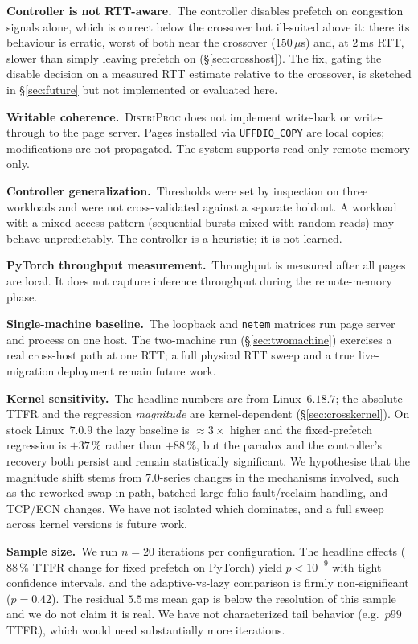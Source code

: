 \documentclass[journal]{IEEEtran}
\newcommand{\distriproc}{\textsc{DistriProc}\xspace}
\begin{document}
\textbf{Controller is not RTT-aware.}\, The controller disables prefetch on
congestion signals alone, which is correct below the crossover but ill-suited
above it: there its behaviour is erratic, worst of both near the crossover
($150\,\mu$s) and, at $2$\,ms RTT, slower than simply leaving prefetch on
(\S\ref{sec:crosshost}). The fix, gating the disable decision on a measured
RTT estimate relative to the crossover, is sketched in \S\ref{sec:future} but
not implemented or evaluated here.

\textbf{Writable coherence.}\, \distriproc does not implement write-back or
write-through to the page server. Pages installed via
\texttt{UFFDIO\_COPY} are local copies; modifications are not propagated.
The system supports read-only remote memory only.

\textbf{Controller generalization.}\, Thresholds were set by inspection
on three workloads and were not cross-validated against a separate
holdout. A workload with a mixed access pattern (sequential bursts mixed
with random reads) may behave unpredictably. The controller is a
heuristic; it is not learned.

\textbf{PyTorch throughput measurement.}\, Throughput is measured after
all pages are local. It does not capture inference throughput during the
remote-memory phase.

\textbf{Single-machine baseline.}\, The loopback and \texttt{netem} matrices
run page server and process on one host. The two-machine run
(\S\ref{sec:twomachine}) exercises a real cross-host path at one RTT; a full
physical RTT sweep and a true live-migration deployment remain future work.

\textbf{Kernel sensitivity.}\, The headline numbers are from Linux~$6.18.7$;
the absolute TTFR and the regression \emph{magnitude} are kernel-dependent
(\S\ref{sec:crosskernel}). On stock Linux~$7.0.9$ the lazy baseline is
$\approx\!3\times$ higher and the fixed-prefetch regression is $+37\,\%$
rather than $+88\,\%$, but the paradox and the controller's recovery both
persist and remain statistically significant. We hypothesise that the
magnitude shift stems from $7.0$-series changes in the mechanisms involved,
such as the reworked swap-in path, batched large-folio fault/reclaim handling,
and TCP/ECN changes. We have not isolated which dominates, and a full sweep
across kernel versions is future work.

\textbf{Sample size.}\, We run $n\!=\!20$ iterations per configuration.
The headline effects ($88\,\%$ TTFR change for fixed prefetch on PyTorch)
yield $p\!<\!10^{-9}$ with tight confidence intervals, and the
adaptive-vs-lazy comparison is firmly non-significant ($p\!=\!0.42$). The
residual $5.5$\,ms mean gap is below the resolution of this sample and we
do not claim it is real. We have not characterized tail behavior (e.g.\
$p99$ TTFR), which would need substantially more iterations.
\end{document}
